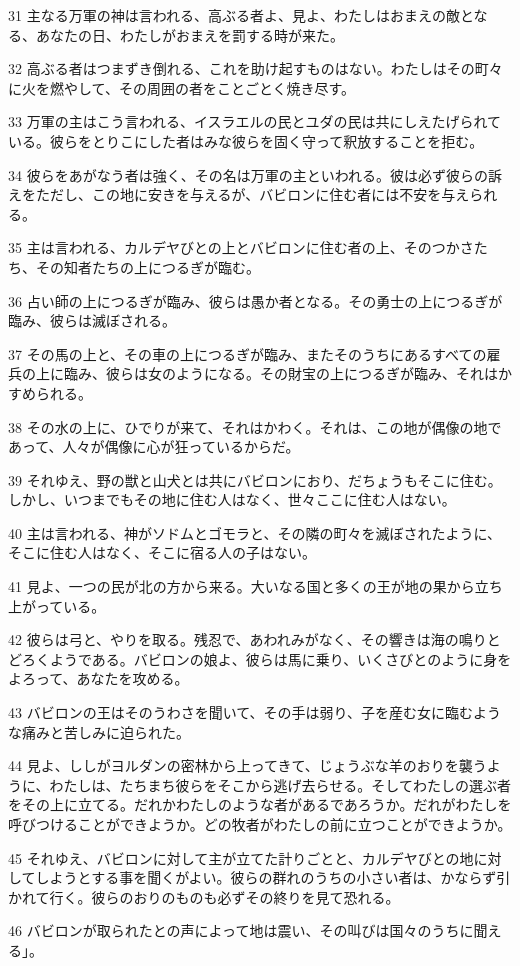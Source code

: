 \par 31 主なる万軍の神は言われる、高ぶる者よ、見よ、わたしはおまえの敵となる、あなたの日、わたしがおまえを罰する時が来た。
\par 32 高ぶる者はつまずき倒れる、これを助け起すものはない。わたしはその町々に火を燃やして、その周囲の者をことごとく焼き尽す。
\par 33 万軍の主はこう言われる、イスラエルの民とユダの民は共にしえたげられている。彼らをとりこにした者はみな彼らを固く守って釈放することを拒む。
\par 34 彼らをあがなう者は強く、その名は万軍の主といわれる。彼は必ず彼らの訴えをただし、この地に安きを与えるが、バビロンに住む者には不安を与えられる。
\par 35 主は言われる、カルデヤびとの上とバビロンに住む者の上、そのつかさたち、その知者たちの上につるぎが臨む。
\par 36 占い師の上につるぎが臨み、彼らは愚か者となる。その勇士の上につるぎが臨み、彼らは滅ぼされる。
\par 37 その馬の上と、その車の上につるぎが臨み、またそのうちにあるすべての雇兵の上に臨み、彼らは女のようになる。その財宝の上につるぎが臨み、それはかすめられる。
\par 38 その水の上に、ひでりが来て、それはかわく。それは、この地が偶像の地であって、人々が偶像に心が狂っているからだ。
\par 39 それゆえ、野の獣と山犬とは共にバビロンにおり、だちょうもそこに住む。しかし、いつまでもその地に住む人はなく、世々ここに住む人はない。
\par 40 主は言われる、神がソドムとゴモラと、その隣の町々を滅ぼされたように、そこに住む人はなく、そこに宿る人の子はない。
\par 41 見よ、一つの民が北の方から来る。大いなる国と多くの王が地の果から立ち上がっている。
\par 42 彼らは弓と、やりを取る。残忍で、あわれみがなく、その響きは海の鳴りとどろくようである。バビロンの娘よ、彼らは馬に乗り、いくさびとのように身をよろって、あなたを攻める。
\par 43 バビロンの王はそのうわさを聞いて、その手は弱り、子を産む女に臨むような痛みと苦しみに迫られた。
\par 44 見よ、ししがヨルダンの密林から上ってきて、じょうぶな羊のおりを襲うように、わたしは、たちまち彼らをそこから逃げ去らせる。そしてわたしの選ぶ者をその上に立てる。だれかわたしのような者があるであろうか。だれがわたしを呼びつけることができようか。どの牧者がわたしの前に立つことができようか。
\par 45 それゆえ、バビロンに対して主が立てた計りごとと、カルデヤびとの地に対してしようとする事を聞くがよい。彼らの群れのうちの小さい者は、かならず引かれて行く。彼らのおりのものも必ずその終りを見て恐れる。
\par 46 バビロンが取られたとの声によって地は震い、その叫びは国々のうちに聞える」。

